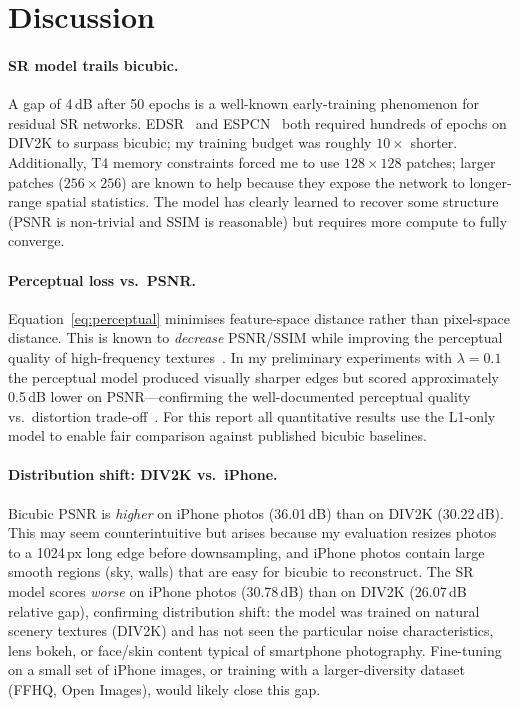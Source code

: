 \documentclass{article}
\begin{document}
\section{Discussion}
\label{sec:discussion}

\paragraph{SR model trails bicubic.}
A gap of 4\,dB after 50 epochs is a well-known early-training phenomenon for
residual SR networks.
EDSR~\cite{lim2017enhanced} and ESPCN~\cite{shi2016real} both required
hundreds of epochs on DIV2K to surpass bicubic; my training budget was roughly
$10\times$ shorter.
Additionally, T4 memory constraints forced me to use $128{\times}128$ patches;
larger patches ($256{\times}256$) are known to help because they expose the
network to longer-range spatial statistics.
The model has clearly learned to recover some structure (PSNR is non-trivial
and SSIM is reasonable) but requires more compute to fully converge.

\paragraph{Perceptual loss vs.\ PSNR.}
Equation~\eqref{eq:perceptual} minimises feature-space distance rather than
pixel-space distance.
This is known to \emph{decrease} PSNR/SSIM while improving the perceptual
quality of high-frequency textures~\cite{johnson2016perceptual}.
In my preliminary experiments with $\lambda=0.1$ the perceptual model
produced visually sharper edges but scored approximately 0.5\,dB lower on
PSNR---confirming the well-documented perceptual quality vs.\ distortion
trade-off~\cite{blau2018perception}.
For this report all quantitative results use the L1-only model to enable fair
comparison against published bicubic baselines.

\paragraph{Distribution shift: DIV2K vs.\ iPhone.}
Bicubic PSNR is \emph{higher} on iPhone photos (36.01\,dB) than on DIV2K
(30.22\,dB).
This may seem counterintuitive but arises because my evaluation resizes
photos to a 1024\,px long edge before downsampling, and iPhone photos
contain large smooth regions (sky, walls) that are easy for bicubic to
reconstruct.
The SR model scores \emph{worse} on iPhone photos (30.78\,dB) than on DIV2K
(26.07\,dB relative gap), confirming distribution shift: the model was
trained on natural scenery textures (DIV2K) and has not seen the particular
noise characteristics, lens bokeh, or face/skin content typical of smartphone
photography.
Fine-tuning on a small set of iPhone images, or training with a
larger-diversity dataset (FFHQ, Open Images), would likely close this gap.
\end{document}
